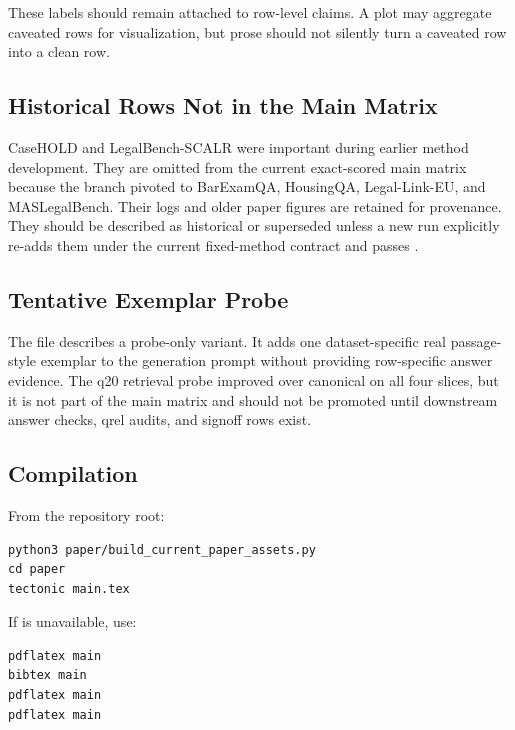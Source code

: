 These labels should remain attached to row-level claims. A plot may aggregate
caveated rows for visualization, but prose should not silently turn a caveated
row into a clean row.

\subsection{Historical Rows Not in the Main Matrix}

CaseHOLD and LegalBench-SCALR were important during earlier method development.
They are omitted from the current exact-scored main matrix because the branch
pivoted to BarExamQA, HousingQA, Legal-Link-EU, and MASLegalBench. Their logs
and older paper figures are retained for provenance. They should be described
as historical or superseded unless a new run explicitly re-adds them under the
current fixed-method  contract and passes \claimgate.

\subsection{Tentative Exemplar Probe}

The file 
describes a probe-only  variant. It adds one
dataset-specific real passage-style exemplar to the generation prompt without
providing row-specific answer evidence. The q20 retrieval probe improved over
canonical \hyre{} on all four slices, but it is not part of the main matrix and
should not be promoted until downstream answer checks, qrel audits, and signoff
rows exist.

\subsection{Compilation}

From the repository root:

\begin{verbatim}
python3 paper/build_current_paper_assets.py
cd paper
tectonic main.tex
\end{verbatim}

If  is unavailable, use:

\begin{verbatim}
pdflatex main
bibtex main
pdflatex main
pdflatex main
\end{verbatim}
